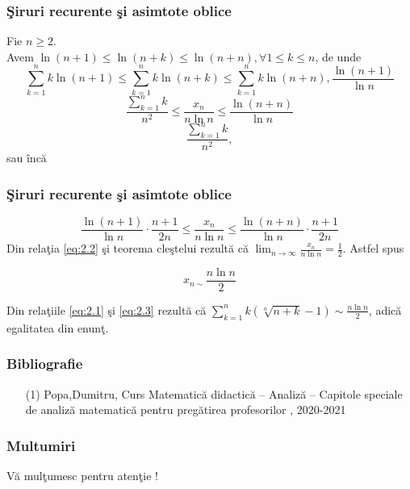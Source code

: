 \documentclass{beamer}
\theoremstyle{plain}
\begin{document}
{
\frametitle{\c Siruri recurente \c si asimtote oblice}
Fie \(n\geq 2\). 
\\ Avem \(\ln \left ( n+1 \right )\leq \ln \left ( n+k \right )\leq \ln \left ( n+n \right ), \forall 1\leq k\leq n\), de unde 
\begin{displaymath}
 \sum_{k=1}^{n} k \ln \left ( n+1 \right )\leq \sum_{k=1}^{n}k \ln \left ( n+k \right )\leq \sum_{k=1}^{n} k \ln \left ( n+n \right ), \frac{\ln \left ( n+1 \right )}{\ln n }
\end{displaymath}
\begin{displaymath}
 \frac{\sum_{k=1}^{n}k}{n^{2}}\leq \frac{x_{n}}{n\ln n}\leq \frac{\ln \left ( n+n \right )}{\ln n }
\end{displaymath}
\begin{displaymath}
 \frac{\sum_{k=1}^{n}k}{n^{2}},
\end{displaymath}
 sau \^ inc\u a
}
\frame
{
\frametitle{\c Siruri recurente \c si asimtote oblice}
\begin{displaymath}
 \frac{\ln \left ( n+1 \right )}{\ln n} \cdot \frac{n+1}{2n}\leq \frac{x_{n}}{n\ln n }\leq \frac{\ln \left ( n+n \right )}{\ln n }\cdot \frac{n+1}{2n} \label{eq:2.2} \tag{2.2}
\end{displaymath}
Din rela\c tia \ref{eq:2.2} \c si teorema cle\c stelui rezult\u a c\u a \(\lim_{n \to \infty }\frac{x_{n}}{n\ln n } = \frac{1}{2}\). Astfel spus 

\begin{displaymath}
x_{n\sim }\frac{n\ln n }{2} \label{eq:2.3} \tag{2.3}
\end{displaymath}

Din rela\c tiile \ref{eq:2.1} \c si \ref{eq:2.3} rezult\u a c\u a \(\sum_{k=1}^{n}k\left ( \sqrt[n]{n+k}-1 \right )\sim \frac{n\ln n }{2}\), adic\u a egalitatea din enun\c t. 

}
\frame
{
\frametitle{Bibliografie}
\begin{itemize}
\item[(1)] Popa,Dumitru, Curs Matematic\u a didactic\u a – Analiz\u a – Capitole speciale de analiz\u a matematic\u a pentru preg\u atirea profesorilor , 2020-2021
\end{itemize}
}
\frame
{\frametitle{Multumiri}
\begin{center}
{\Large V\u a mul\c tumesc pentru aten\c tie !}	
\end{center}
}
\end{document}
